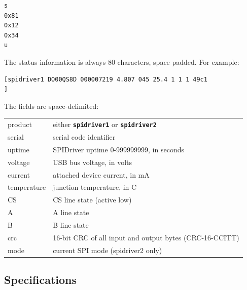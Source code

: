 \documentclass{article}
\newcommand{\mach}[1]{\texttt{\textbf{#1}}}
\newcommand{\gap}{\vspace{10pt}}
\begin{document}
\begin{lstlisting}
s
0x81
0x12
0x34
u
\end{lstlisting}


The status information is always 80 characters, space padded. For example:

{\scriptsize
\begin{framed}\begin{Verbatim}
[spidriver1 DO00QS8D 000007219 4.807 045 25.4 1 1 1 49c1                       ]
\end{Verbatim}
\end{framed}}

The fields are space-delimited:

\gap\begin{tabular}{ll}
\hline
product         & either \mach{spidriver1} or \mach{spidriver2} \\
serial          & serial code identifier \\
uptime          & SPIDriver uptime 0-999999999, in seconds \\
voltage         & USB bus voltage, in volts \\
current         & attached device current, in mA \\
temperature     & junction temperature, in C \\
CS              & CS line state (active low) \\
A               & A line state \\
B               & B line state \\
crc             & 16-bit CRC of all input and output bytes (CRC-16-CCITT)  \index{CRC}\\
mode            & current SPI mode (spidriver2 only) \index{mode!SPI}\\
\hline
\end{tabular}\gap

\newpage
\subsection{Specifications}\label{electrical-characteristics}
\end{document}
